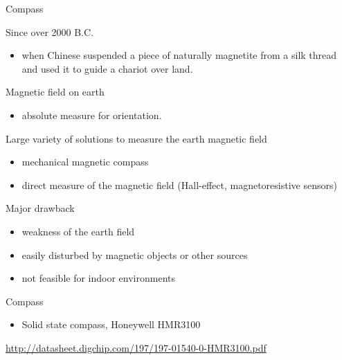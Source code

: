 \documentclass[compress]{beamer}
\begin{document}
\begin{frame}{Compass}

Since over 2000 B.C.

\begin{itemize}

\item
  when Chinese suspended a piece of naturally magnetite from a silk
  thread and used it to guide a chariot over land.
\end{itemize}

Magnetic field on earth

\begin{itemize}

\item
  absolute measure for orientation.
\end{itemize}

Large variety of solutions to measure the earth magnetic field

\begin{itemize}

\item
  mechanical magnetic compass
\item
  direct measure of the magnetic field (Hall-effect, magnetoresistive
  sensors)
\end{itemize}

Major drawback

\begin{itemize}

\item
  weakness of the earth field
\item
  easily disturbed by magnetic objects or other sources
\item
  not feasible for indoor environments
\end{itemize}

\end{frame}

\begin{frame}{Compass}

\begin{itemize}

\item
  Solid state compass, \eg Honeywell HMR3100
\end{itemize}

\url{http://datasheet.digchip.com/197/197-01540-0-HMR3100.pdf}

\end{frame}
\end{document}
